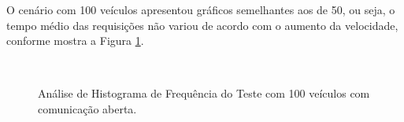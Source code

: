 \documentclass[
	12pt,				%
	oneside,			%
	a4paper,			%
	english,			%
	brazil				%
	]{abntex2ppgsi}
\begin{document}
O cenário com 100 veículos apresentou gráficos semelhantes aos de 50, ou seja, o tempo médio das requisições não variou de acordo com o aumento da velocidade, conforme mostra a Figura \ref{fig:imgHistFreq100}.

\begin{figure}[h!]
	\caption{Análise de Histograma de Frequência do Teste  com 100 veículos com comunicação aberta.}
	\centering
	\label{fig:imgHistFreq100}
	\\
\end{figure}
\end{document}
